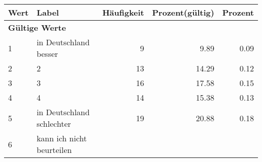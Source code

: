      \begin{longtable}{lXrrr}
     \toprule
     \textbf{Wert} & \textbf{Label} & \textbf{Häufigkeit} & \textbf{Prozent(gültig)} & \textbf{Prozent} \\
     \endhead
     \midrule
     \multicolumn{5}{l}{\textbf{Gültige Werte}}\\

     1 &
     \multicolumn{1}{X}{ in Deutschland besser   } &


       \num{9} &
       \num[round-mode=places,round-precision=2]{9,89} &
         \num[round-mode=places,round-precision=2]{0,09} \\

     2 &
     \multicolumn{1}{X}{ 2   } &


       \num{13} &
       \num[round-mode=places,round-precision=2]{14,29} &
         \num[round-mode=places,round-precision=2]{0,12} \\

     3 &
     \multicolumn{1}{X}{ 3   } &


       \num{16} &
       \num[round-mode=places,round-precision=2]{17,58} &
         \num[round-mode=places,round-precision=2]{0,15} \\

     4 &
     \multicolumn{1}{X}{ 4   } &


       \num{14} &
       \num[round-mode=places,round-precision=2]{15,38} &
         \num[round-mode=places,round-precision=2]{0,13} \\

     5 &
     \multicolumn{1}{X}{ in Deutschland schlechter   } &


       \num{19} &
       \num[round-mode=places,round-precision=2]{20,88} &
         \num[round-mode=places,round-precision=2]{0,18} \\

     6 &
     \multicolumn{1}{X}{ kann ich nicht beurteilen   } &



\end{longtable}
